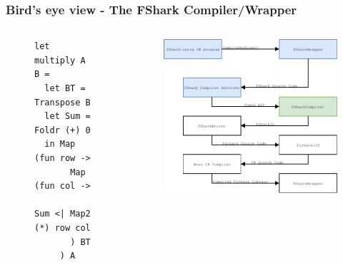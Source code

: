 \documentclass[10pt, compress]{beamer}
\begin{document}
\begin{frame}[fragile]
  \frametitle{Bird's eye view - The FShark Compiler/Wrapper}
\begin{columns}[t] %
\begin{column}{.38\textwidth}
  \begin{figure}
\begin{verbatim}
let multiply A B =
  let BT = Transpose B
  let Sum = Foldr (+) 0
  in Map (fun row ->
       Map (fun col -> 
         Sum <| Map2 (*) row col
       ) BT
     ) A
\end{verbatim}
  \end{figure}
\end{column}
\hfill
\begin{column}{.60\textwidth}
  \begin{figure}
    \includegraphics[scale=0.7]{./images/pipeline/pipeline5}
  \end{figure}
\end{column}
\end{columns}
\end{frame}
\end{document}
